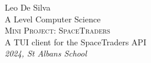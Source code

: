 \begin{titlepage}
	\raggedleft
	{\Large Leo De Silva\\[1in]}
	{\large A Level Computer Science\\}
	{\Huge\scshape Mini Project: SpaceTraders\\[.2in]}
	{\large A TUI client for the SpaceTraders API\\}
	\vfill
	{\itshape 2024, St Albans School}
\end{titlepage}
\restoregeometry
